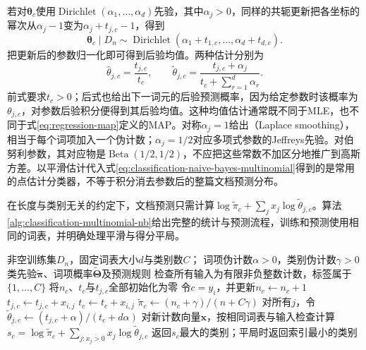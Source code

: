 若对$\bm{\theta}_c$使用$\operatorname{Dirichlet}(\alpha_1,\ldots,\alpha_d)$先验，其中$\alpha_j>0$，同样的共轭更新把各坐标的幂次从$\alpha_j-1$变为$\alpha_j+t_{j,c}-1$，得到
\[
  \bm{\theta}_c\mid D_n
  \sim\operatorname{Dirichlet}
    (\alpha_1+t_{1,c},\ldots,\alpha_d+t_{d,c}).
\]
把更新后的参数归一化即可得到后验均值。两种估计分别为
\begin{equation}
  \label{eq:classification-naive-bayes-smoothing}
  \hat\theta_{j,c}=\frac{t_{j,c}}{t_c},
  \qquad
  \tilde\theta_{j,c}
  =\frac{t_{j,c}+\alpha_j}
         {t_c+\sum_{r=1}^{d}\alpha_r}.
\end{equation}
前式要求$t_c>0$；后式也给出下一词元的后验预测概率，因为给定参数时该概率为$\theta_{j,c}$，对参数后验积分便得到其后验均值。这种均值估计通常既不同于MLE，也不同于式\eqref{eq:regression-map}定义的MAP。对称$\alpha_j=1$给出（Laplace smoothing），相当于每个词项加入一个伪计数；$\alpha_j=1/2$对应多项式参数的Jeffreys先验。对伯努利参数，其对应物是$\operatorname{Beta}(1/2,1/2)$，不应把这些常数不加区分地推广到高斯方差。以平滑估计代入式\eqref{eq:classification-naive-bayes-multinomial}得到的是常用的点估计分类器，不等于积分消去参数后的整篇文档预测分布。

在长度与类别无关的约定下，文档预测只需计算$\log\tilde\pi_c+\sum_jx_j\log\tilde\theta_{j,c}$。算法\ref{alg:classification-multinomial-nb}给出完整的统计与预测流程，训练和预测使用相同的词表，并明确处理平滑与得分平局。
\begin{algorithm}[带平滑的多项式朴素贝叶斯]
  \label{alg:classification-multinomial-nb}
  \begin{algorithmic}[1]
    \Require 非空训练集$D_n$，固定词表大小$d$与类别数$C$；
    \Statex \hspace{\algorithmicindent} 词项伪计数$\alpha>0$，类别伪计数$\gamma>0$
    \Ensure 类先验$\tilde{\bm{\pi}}$、词项概率$\tilde{\bm{\Theta}}$及预测规则
    \State 检查所有输入为有限非负整数计数，标签属于$\{1,\ldots,C\}$
    \State 将$n_c$、$t_c$与$t_{j,c}$全部初始化为零
      \State 令$c=y_i$，并更新$n_c\gets n_c+1$
        \State $t_{j,c}\gets t_{j,c}+x_{i,j}$
        \State $t_c\gets t_c+x_{i,j}$
      \EndFor
    \EndFor
      \State $\tilde\pi_c\gets(n_c+\gamma)/(n+C\gamma)$
      \State 对所有$j$，令$\tilde\theta_{j,c}\gets(t_{j,c}+\alpha)/(t_c+d\alpha)$
    \EndFor
    \State 对新计数向量$\bm{x}$，按相同词表与输入检查计算
    \Statex \hspace{\algorithmicindent}
      $s_c=\log\tilde\pi_c+\sum_{j:x_j>0}x_j\log\tilde\theta_{j,c}$
    \State 返回$s_c$最大的类别；平局时返回索引最小的类别
  \end{algorithmic}
\end{algorithm}

